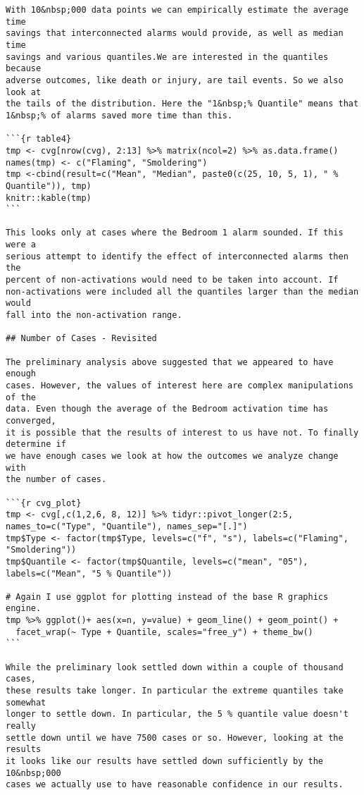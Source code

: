 \begin{lstlisting}[basicstyle=\scriptsize]
With 10&nbsp;000 data points we can empirically estimate the average time
savings that interconnected alarms would provide, as well as median time
savings and various quantiles.We are interested in the quantiles because
adverse outcomes, like death or injury, are tail events. So we also look at
the tails of the distribution. Here the "1&nbsp;% Quantile" means that
1&nbsp;% of alarms saved more time than this.

```{r table4}
tmp <- cvg[nrow(cvg), 2:13] %>% matrix(ncol=2) %>% as.data.frame()
names(tmp) <- c("Flaming", "Smoldering")
tmp <-cbind(result=c("Mean", "Median", paste0(c(25, 10, 5, 1), " % Quantile")), tmp)
knitr::kable(tmp)
```

This looks only at cases where the Bedroom 1 alarm sounded. If this were a
serious attempt to identify the effect of interconnected alarms then the
percent of non-activations would need to be taken into account. If
non-activations were included all the quantiles larger than the median would
fall into the non-activation range.

## Number of Cases - Revisited

The preliminary analysis above suggested that we appeared to have enough
cases. However, the values of interest here are complex manipulations of the
data. Even though the average of the Bedroom activation time has converged,
it is possible that the results of interest to us have not. To finally determine if
we have enough cases we look at how the outcomes we analyze change with
the number of cases.

```{r cvg_plot}
tmp <- cvg[,c(1,2,6, 8, 12)] %>% tidyr::pivot_longer(2:5, names_to=c("Type", "Quantile"), names_sep="[.]")
tmp$Type <- factor(tmp$Type, levels=c("f", "s"), labels=c("Flaming", "Smoldering"))
tmp$Quantile <- factor(tmp$Quantile, levels=c("mean", "05"), labels=c("Mean", "5 % Quantile"))

# Again I use ggplot for plotting instead of the base R graphics engine.
tmp %>% ggplot()+ aes(x=n, y=value) + geom_line() + geom_point() +
  facet_wrap(~ Type + Quantile, scales="free_y") + theme_bw()
```

While the preliminary look settled down within a couple of thousand cases,
these results take longer. In particular the extreme quantiles take somewhat
longer to settle down. In particular, the 5 % quantile value doesn't really
settle down until we have 7500 cases or so. However, looking at the results
it looks like our results have settled down sufficiently by the 10&nbsp;000
cases we actually use to have reasonable confidence in our results.


\end{lstlisting}

